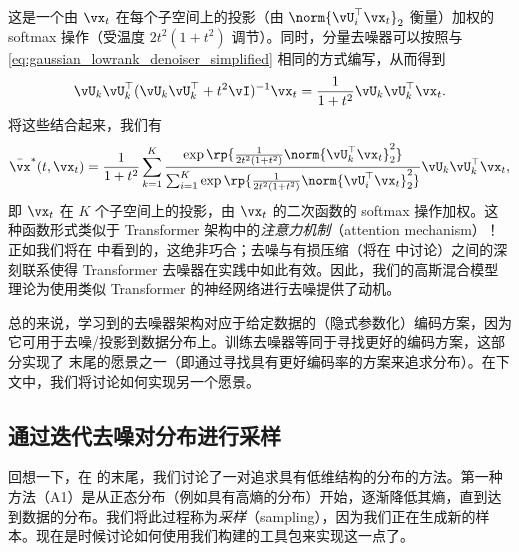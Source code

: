\documentclass[../../book-main_zh.tex]{subfiles}
\begin{document}
这是一个由 \(\vx_{t}\) 在每个子空间上的投影（由 \(\norm{\vU_{i}^{\top}\vx_{t}}_{2}\) 衡量）加权的 softmax 操作（受温度 \(2t^{2}(1 + t^{2})\) 调节）。同时，分量去噪器可以按照与 \eqref{eq:gaussian_lowrank_denoiser_simplified} 相同的方式编写，从而得到
\begin{equation}
    \vU_{k}\vU_{k}^{\top}(\vU_{k}\vU_{k}^{\top} +
    t^{2}\vI)^{-1}\vx_{t} = \frac{1}{1 + t^{2}}\vU_{k}\vU_{k}^{\top}\vx_{t}.
\end{equation}
将这些结合起来，我们有
\begin{equation}\label{eq:gmm_lowrank_denoiser}
    \bar{\vx}^{\ast}(t, \vx_{t}) = \frac{1}{1 + t^{2}}\sum_{k =
    1}^{K}\frac{\exp\rp{\frac{1}{2t^{2}(1 +
    t^{2})}\norm{\vU_{k}^{\top}\vx_{t}}_{2}^{2}}}{\sum_{i =
        1}^{K}\exp\rp{\frac{1}{2t^{2}(1 +
    t^{2})}\norm{\vU_{i}^{\top}\vx_{t}}_{2}^{2}}}\vU_{k}\vU_{k}^{\top}\vx_{t},
\end{equation}
即 \(\vx_{t}\) 在 \(K\) 个子空间上的投影，由 \(\vx_{t}\) 的二次函数的 softmax 操作加权。这种函数形式类似于 Transformer 架构中的\textit{注意力机制}（attention mechanism）！正如我们将在  中看到的，这绝非巧合；去噪与有损压缩（将在  中讨论）之间的深刻联系使得 Transformer 去噪器在实践中如此有效。因此，我们的高斯混合模型理论为使用类似 Transformer 的神经网络进行去噪提供了动机。

总的来说，学习到的去噪器架构对应于给定数据的（隐式参数化）编码方案，因为它可用于去噪/投影到数据分布上。训练去噪器等同于寻找更好的编码方案，这部分实现了  末尾的愿景之一（即通过寻找具有更好编码率的方案来追求分布）。在下文中，我们将讨论如何实现另一个愿景。

\subsection{通过迭代去噪对分布进行采样}\label{sub:sampling_denoising}

回想一下，在  的末尾，我们讨论了一对追求具有低维结构的分布的方法。第一种方法（A1）是从正态分布（例如具有高熵的分布）开始，逐渐降低其熵，直到达到数据的分布。我们将此过程称为\textit{采样}（sampling），因为我们正在生成新的样本。现在是时候讨论如何使用我们构建的工具包来实现这一点了。
\end{document}

